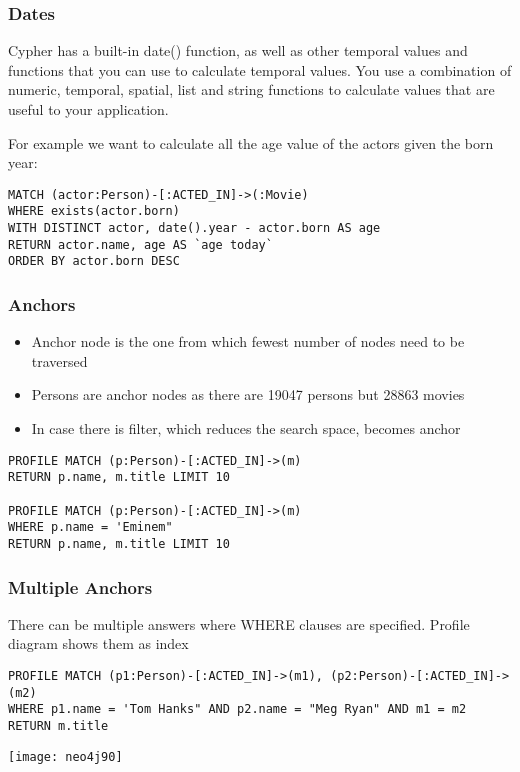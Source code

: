 \begin{frame}[fragile]\frametitle{Dates}

Cypher has a built-in date() function, as well as other temporal values and functions that you can use to calculate temporal values. You use a combination of numeric, temporal, spatial, list and string functions to calculate values that are useful to your application.

For example we want to calculate all the age value of the actors given the born year:

\begin{lstlisting}
MATCH (actor:Person)-[:ACTED_IN]->(:Movie)
WHERE exists(actor.born)
WITH DISTINCT actor, date().year - actor.born AS age
RETURN actor.name, age AS `age today`
ORDER BY actor.born DESC
\end{lstlisting}

\end{frame}





\begin{frame}[fragile]\frametitle{Anchors}

\begin{itemize}
\item Anchor node is the one from which fewest number of nodes need to be traversed
\item Persons are anchor nodes as there are 19047 persons but 28863 movies
\item In case there is filter, which reduces the search space, becomes anchor
\end{itemize}

\begin{lstlisting}
PROFILE MATCH (p:Person)-[:ACTED_IN]->(m)
RETURN p.name, m.title LIMIT 10

PROFILE MATCH (p:Person)-[:ACTED_IN]->(m)
WHERE p.name = 'Eminem"
RETURN p.name, m.title LIMIT 10
\end{lstlisting}



\end{frame}

\begin{frame}[fragile]\frametitle{Multiple Anchors}
There can be multiple answers where WHERE clauses are specified. Profile diagram shows them as index

\begin{lstlisting}
PROFILE MATCH (p1:Person)-[:ACTED_IN]->(m1), (p2:Person)-[:ACTED_IN]->(m2)
WHERE p1.name = 'Tom Hanks" AND p2.name = "Meg Ryan" AND m1 = m2
RETURN m.title

\end{lstlisting}

\begin{center}
\texttt{[image: neo4j90]}
\end{center}	  

\end{frame}


